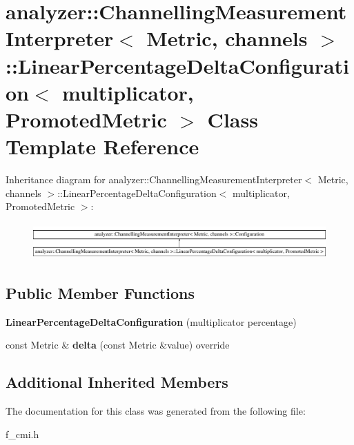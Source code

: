 \hypertarget{classanalyzer_1_1_channelling_measurement_interpreter_1_1_linear_percentage_delta_configuration}{}\section{analyzer\+::Channelling\+Measurement\+Interpreter$<$ Metric, channels $>$\+::Linear\+Percentage\+Delta\+Configuration$<$ multiplicator, Promoted\+Metric $>$ Class Template Reference}
\label{classanalyzer_1_1_channelling_measurement_interpreter_1_1_linear_percentage_delta_configuration}
Inheritance diagram for analyzer\+::Channelling\+Measurement\+Interpreter$<$ Metric, channels $>$\+::Linear\+Percentage\+Delta\+Configuration$<$ multiplicator, Promoted\+Metric $>$\+:\begin{figure}[H]
\begin{center}
\leavevmode
\includegraphics[height=1.403509cm]{classanalyzer_1_1_channelling_measurement_interpreter_1_1_linear_percentage_delta_configuration}
\end{center}
\end{figure}
\subsection*{Public Member Functions}
\begin{DoxyCompactItemize}
\item 
\mbox{\label{classanalyzer_1_1_channelling_measurement_interpreter_1_1_linear_percentage_delta_configuration_ae87ffde1302a73f237e26f667b603cf6}} 
{\bfseries Linear\+Percentage\+Delta\+Configuration} (multiplicator percentage)
\item 
\mbox{\label{classanalyzer_1_1_channelling_measurement_interpreter_1_1_linear_percentage_delta_configuration_a134d03adfc0d9cbe7a5c8910943f9cad}} 
const Metric \& {\bfseries delta} (const Metric \&value) override
\end{DoxyCompactItemize}
\subsection*{Additional Inherited Members}


The documentation for this class was generated from the following file\+:\begin{DoxyCompactItemize}
\item 
f\+\_\+cmi.\+h\end{DoxyCompactItemize}
